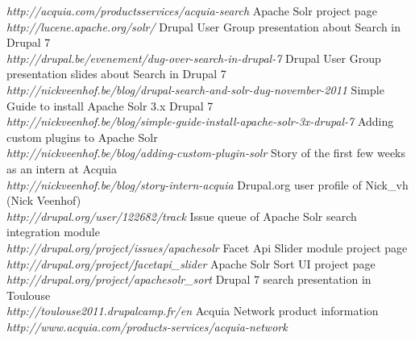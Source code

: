 \begin{thebibliography}{99}
		\emph{http://acquia.com/productsservices/acquia-search}
		Apache Solr project page\\
		\emph{http://lucene.apache.org/solr/}
		Drupal User Group presentation about Search in Drupal 7\\
		\emph{http://drupal.be/evenement/dug-over-search-in-drupal-7}
		Drupal User Group presentation slides about Search in Drupal 7\\
		\emph{http://nickveenhof.be/blog/drupal-search-and-solr-dug-november-2011}
		Simple Guide to install Apache Solr 3.x Drupal 7\\
		\emph{http://nickveenhof.be/blog/simple-guide-install-apache-solr-3x-drupal-7}
		Adding custom plugins to Apache Solr\\
		\emph{http://nickveenhof.be/blog/adding-custom-plugin-solr}
		Story of the first few weeks as an intern at Acquia\\
		\emph{http://nickveenhof.be/blog/story-intern-acquia}
		Drupal.org user profile of Nick\_vh (Nick Veenhof)\\
		\emph{http://drupal.org/user/122682/track}
		Issue queue of Apache Solr search integration module\\
		\emph{http://drupal.org/project/issues/apachesolr}
		Facet Api Slider module project page\\
		\emph{http://drupal.org/project/facetapi\_slider}
		Apache Solr Sort UI project page\\
		\emph{http://drupal.org/project/apachesolr\_sort}
		Drupal 7 search presentation in Toulouse\\
		\emph{http://toulouse2011.drupalcamp.fr/en}
		Acquia Network product information\\
		\emph{http://www.acquia.com/products-services/acquia-network}
\end{thebibliography}

